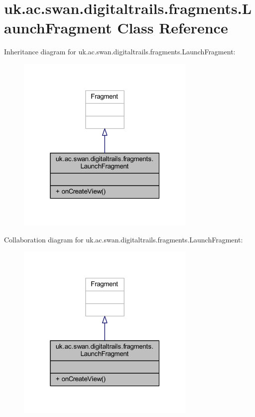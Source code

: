 \hypertarget{classuk_1_1ac_1_1swan_1_1digitaltrails_1_1fragments_1_1_launch_fragment}{\section{uk.\+ac.\+swan.\+digitaltrails.\+fragments.\+Launch\+Fragment Class Reference}
\label{classuk_1_1ac_1_1swan_1_1digitaltrails_1_1fragments_1_1_launch_fragment}
}


Inheritance diagram for uk.\+ac.\+swan.\+digitaltrails.\+fragments.\+Launch\+Fragment\+:
\nopagebreak
\begin{figure}[H]
\begin{center}
\leavevmode
\includegraphics[width=244pt]{classuk_1_1ac_1_1swan_1_1digitaltrails_1_1fragments_1_1_launch_fragment__inherit__graph}
\end{center}
\end{figure}


Collaboration diagram for uk.\+ac.\+swan.\+digitaltrails.\+fragments.\+Launch\+Fragment\+:
\nopagebreak
\begin{figure}[H]
\begin{center}
\leavevmode
\includegraphics[width=244pt]{classuk_1_1ac_1_1swan_1_1digitaltrails_1_1fragments_1_1_launch_fragment__coll__graph}
\end{center}
\end{figure}
